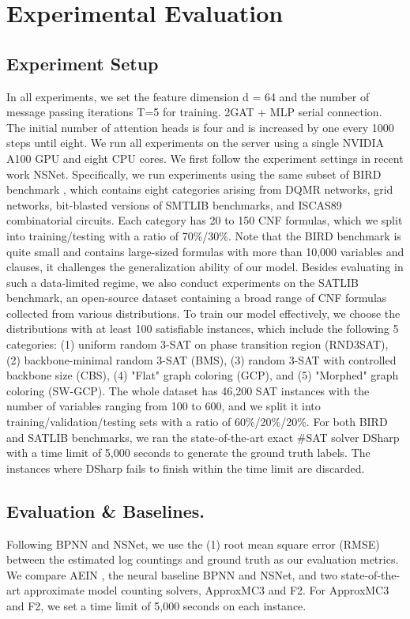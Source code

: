 \section{Experimental Evaluation}
\subsection{Experiment Setup}
In all experiments, we set the feature dimension d = 64 and the number of message passing iterations T=5 for training. 
2GAT + MLP serial connection. The initial number of attention heads is four and is increased by one every 1000 steps 
until eight. We run all experiments on the server using a single NVIDIA A100 GPU and eight CPU cores.
We first follow the experiment settings in recent work NSNet. Specifically, we run experiments using the same subset 
of BIRD benchmark\cite{DBLP:conf/aaai/SoosM19} , which contains eight categories arising from DQMR networks, grid networks, bit-blasted 
versions of SMTLIB benchmarks, and ISCAS89 combinatorial circuits. Each category has 20 to 150 CNF formulas, which we 
split into training/testing with a ratio of 70\%/30\%. Note that the BIRD benchmark is quite small and contains 
large-sized formulas with more than 10,000 variables and clauses, it challenges the generalization ability of our model. 
Besides evaluating in such a data-limited regime, we also conduct experiments on the SATLIB benchmark, an open-source 
dataset containing a broad range of CNF formulas collected from various distributions. To train our model effectively, 
we choose the distributions with at least 100 satisfiable instances, which include the following 5 categories: (1) uniform 
random 3-SAT on phase transition region (RND3SAT), (2) backbone-minimal random 3-SAT (BMS), (3) random 3-SAT with controlled
backbone size (CBS), (4) "Flat" graph coloring (GCP), and (5) "Morphed" graph coloring (SW-GCP). The whole dataset has 
46,200 SAT instances with the number of variables ranging from 100 to 600, and we split it into training/validation/testing 
sets with a ratio of 60\%/20\%/20\%. For both BIRD and SATLIB benchmarks, we ran the state-of-the-art exact \#SAT solver 
DSharp\cite{DBLP:conf/ai/MuiseMBH12} with a time limit of 5,000 seconds to generate the ground truth labels. The instances where DSharp fails to 
finish within the time limit are discarded.

\subsection{Evaluation \& Baselines.}
Following BPNN and NSNet, we use the (1) root mean square error (RMSE) between the estimated log countings and ground truth 
as our evaluation metrics. We compare AEIN , the neural baseline BPNN and NSNet, and two state-of-the-art approximate model
counting solvers, ApproxMC3\cite{DBLP:conf/aaai/SoosM19} and F2\cite{DBLP:conf/sat/AchlioptasHT18a}. For ApproxMC3 and F2, we set a time limit of 5,000 seconds on each instance.

